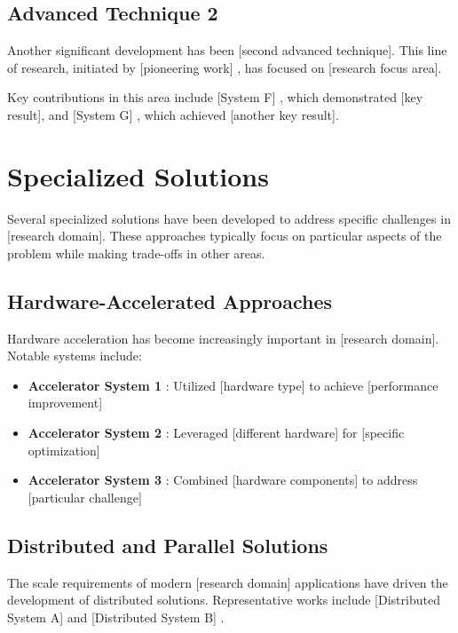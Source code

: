 \subsection{Advanced Technique 2}

Another significant development has been [second advanced technique]. This line of research, initiated by [pioneering work] \cite{example-reference-17}, has focused on [research focus area].

\lipsum[3]

Key contributions in this area include [System F] \cite{example-reference-18}, which demonstrated [key result], and [System G] \cite{example-reference-19}, which achieved [another key result].

\section{Specialized Solutions}

Several specialized solutions have been developed to address specific challenges in [research domain]. These approaches typically focus on particular aspects of the problem while making trade-offs in other areas.

\subsection{Hardware-Accelerated Approaches}

Hardware acceleration has become increasingly important in [research domain]. Notable systems include:

\begin{itemize}
    \item \textbf{Accelerator System 1} \cite{example-reference-20}: Utilized [hardware type] to achieve [performance improvement]
    \item \textbf{Accelerator System 2} \cite{example-reference-21}: Leveraged [different hardware] for [specific optimization]
    \item \textbf{Accelerator System 3} \cite{example-reference-22}: Combined [hardware components] to address [particular challenge]
\end{itemize}

\subsection{Distributed and Parallel Solutions}

The scale requirements of modern [research domain] applications have driven the development of distributed solutions. Representative works include [Distributed System A] \cite{example-reference-23} and [Distributed System B] \cite{example-reference-24}.

